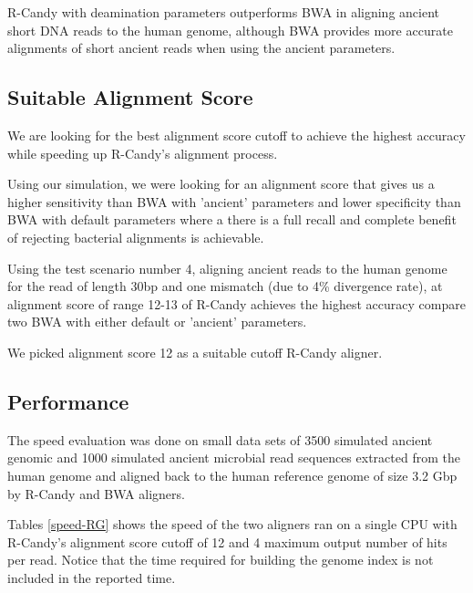 \documentclass[11pt,a4paper]{report}
\begin{document}
R-Candy with deamination parameters outperforms BWA in aligning ancient 
short DNA reads to the human genome, although 
BWA provides more accurate alignments of short 
ancient reads when using the ancient parameters. 
 



\subsection{Suitable Alignment Score} 
\label{Suitable Alignment Score}

We are looking for the best alignment score cutoff to achieve the 
highest accuracy while speeding up R-Candy's alignment process.

Using our simulation, we were looking for an alignment score that 
gives us a higher sensitivity than BWA with 'ancient' parameters 
and lower specificity than BWA with default parameters where a
there is a full recall and complete benefit of rejecting bacterial 
alignments is achievable.

Using the test scenario number 4, aligning ancient reads to the human
genome for the read of length 30bp and one mismatch (due to 4\% 
divergence rate), at alignment score of range 12-13 of R-Candy 
achieves the highest accuracy compare two BWA with either default
or 'ancient' parameters.

We picked alignment score 12 as a suitable cutoff R-Candy aligner. 


\subsection{Performance} \label{Performance}

The speed evaluation was done on small data sets of 3500 simulated ancient 
genomic and 1000 simulated ancient microbial read sequences extracted from
the human genome and aligned back to the human reference genome of size 3.2 
Gbp by R-Candy and BWA aligners.

Tables \ref{speed-RG} shows the speed of 
the two aligners ran on a single CPU with R-Candy's alignment score cutoff 
of 12 and 4 maximum output number of hits per read.
Notice that the time required for building the genome index is 
not included in the reported time.\\
\end{document}
